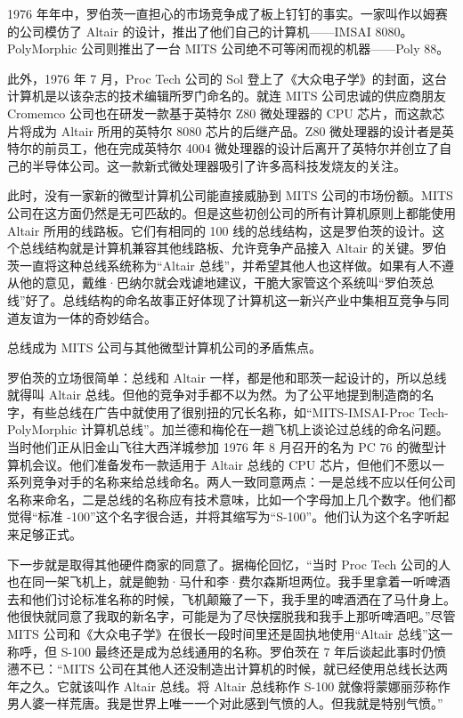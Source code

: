 \documentclass[12pt,UTF8]{ctexbook}
\begin{document}
1976 年年中，罗伯茨一直担心的市场竞争成了板上钉钉的事实。一家叫作以姆赛的公司模仿了 Altair 的设计，推出了他们自己的计算机——IMSAI 8080。PolyMorphic 公司则推出了一台 MITS 公司绝不可等闲而视的机器——Poly 88。

此外，1976 年 7 月，Proc Tech 公司的 Sol 登上了《大众电子学》的封面，这台计算机是以该杂志的技术编辑所罗门命名的。就连 MITS 公司忠诚的供应商朋友 Cromemco 公司也在研发一款基于英特尔 Z80 微处理器的 CPU 芯片，而这款芯片将成为 Altair 所用的英特尔 8080 芯片的后继产品。Z80 微处理器的设计者是英特尔的前员工，他在完成英特尔 4004 微处理器的设计后离开了英特尔并创立了自己的半导体公司。这一款新式微处理器吸引了许多高科技发烧友的关注。

此时，没有一家新的微型计算机公司能直接威胁到 MITS 公司的市场份额。MITS 公司在这方面仍然是无可匹敌的。但是这些初创公司的所有计算机原则上都能使用 Altair 所用的线路板。它们有相同的 100 线的总线结构，这是罗伯茨的设计。这个总线结构就是计算机兼容其他线路板、允许竞争产品接入 Altair 的关键。罗伯茨一直将这种总线系统称为“Altair 总线”，并希望其他人也这样做。如果有人不遵从他的意见，戴维·巴纳尔就会戏谑地建议，干脆大家管这个系统叫“罗伯茨总线”好了。总线结构的命名故事正好体现了计算机这一新兴产业中集相互竞争与同道友谊为一体的奇妙结合。

总线成为 MITS 公司与其他微型计算机公司的矛盾焦点。

罗伯茨的立场很简单：总线和 Altair 一样，都是他和耶茨一起设计的，所以总线就得叫 Altair 总线。但他的竞争对手都不以为然。为了公平地提到制造商的名字，有些总线在广告中就使用了很别扭的冗长名称，如“MITS-IMSAI-Proc Tech-PolyMorphic 计算机总线”。加兰德和梅伦在一趟飞机上谈论过总线的命名问题。当时他们正从旧金山飞往大西洋城参加 1976 年 8 月召开的名为 PC 76 的微型计算机会议。他们准备发布一款适用于 Altair 总线的 CPU 芯片，但他们不愿以一系列竞争对手的名称来给总线命名。两人一致同意两点：一是总线不应以任何公司名称来命名，二是总线的名称应有技术意味，比如一个字母加上几个数字。他们都觉得“标准 -100”这个名字很合适，并将其缩写为“S-100”。他们认为这个名字听起来足够正式。

下一步就是取得其他硬件商家的同意了。据梅伦回忆，“当时 Proc Tech 公司的人也在同一架飞机上，就是鲍勃·马什和李·费尔森斯坦两位。我手里拿着一听啤酒去和他们讨论标准名称的时候，飞机颠簸了一下，我手里的啤酒洒在了马什身上。他很快就同意了我取的新名字，可能是为了尽快摆脱我和我手上那听啤酒吧。”尽管 MITS 公司和《大众电子学》在很长一段时间里还是固执地使用“Altair 总线”这一称呼，但 S-100 最终还是成为总线通用的名称。罗伯茨在 7 年后谈起此事时仍愤懑不已：“MITS 公司在其他人还没制造出计算机的时候，就已经使用总线长达两年之久。它就该叫作 Altair 总线。将 Altair 总线称作 S-100 就像将蒙娜丽莎称作男人婆一样荒唐。我是世界上唯一一个对此感到气愤的人。但我就是特别气愤。”
\end{document}
